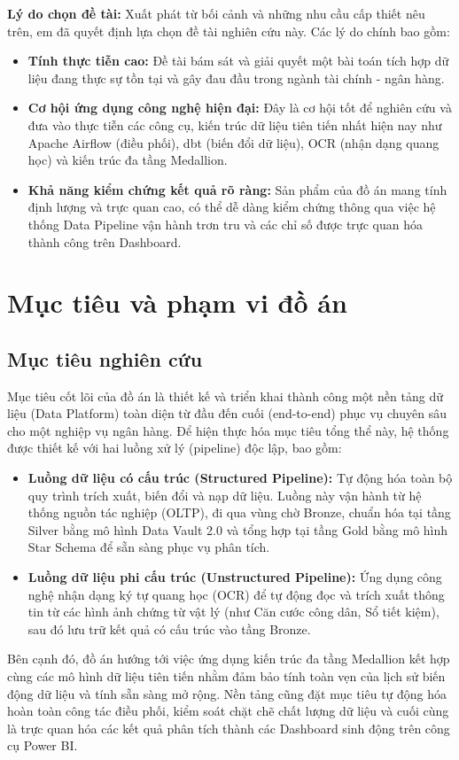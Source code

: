 \textbf{Lý do chọn đề tài:} 
Xuất phát từ bối cảnh và những nhu cầu cấp thiết nêu trên, em đã quyết định lựa chọn đề tài nghiên cứu này. Các lý do chính bao gồm:
\begin{itemize}
    \item \textbf{Tính thực tiễn cao:} Đề tài bám sát và giải quyết một bài toán tích hợp dữ liệu đang thực sự tồn tại và gây đau đầu trong ngành tài chính - ngân hàng.
    \item \textbf{Cơ hội ứng dụng công nghệ hiện đại:} Đây là cơ hội tốt để nghiên cứu và đưa vào thực tiễn các công cụ, kiến trúc dữ liệu tiên tiến nhất hiện nay như Apache Airflow (điều phối), dbt (biến đổi dữ liệu), OCR (nhận dạng quang học) và kiến trúc đa tầng Medallion.
    \item \textbf{Khả năng kiểm chứng kết quả rõ ràng:} Sản phẩm của đồ án mang tính định lượng và trực quan cao, có thể dễ dàng kiểm chứng thông qua việc hệ thống Data Pipeline vận hành trơn tru và các chỉ số được trực quan hóa thành công trên Dashboard.
\end{itemize}

\section{Mục tiêu và phạm vi đồ án}

\subsection{Mục tiêu nghiên cứu}
Mục tiêu cốt lõi của đồ án là thiết kế và triển khai thành công một nền tảng dữ liệu (Data Platform) toàn diện từ đầu đến cuối (end-to-end) phục vụ chuyên sâu cho một nghiệp vụ ngân hàng. Để hiện thực hóa mục tiêu tổng thể này, hệ thống được thiết kế với hai luồng xử lý (pipeline) độc lập, bao gồm:
\begin{itemize}
    \item \textbf{Luồng dữ liệu có cấu trúc (Structured Pipeline):} Tự động hóa toàn bộ quy trình trích xuất, biến đổi và nạp dữ liệu. Luồng này vận hành từ hệ thống nguồn tác nghiệp (OLTP), đi qua vùng chờ Bronze, chuẩn hóa tại tầng Silver bằng mô hình Data Vault 2.0 và tổng hợp tại tầng Gold bằng mô hình Star Schema để sẵn sàng phục vụ phân tích.
    \item \textbf{Luồng dữ liệu phi cấu trúc (Unstructured Pipeline):} Ứng dụng công nghệ nhận dạng ký tự quang học (OCR) để tự động đọc và trích xuất thông tin từ các hình ảnh chứng từ vật lý (như Căn cước công dân, Sổ tiết kiệm), sau đó lưu trữ kết quả có cấu trúc vào tầng Bronze.
\end{itemize}
Bên cạnh đó, đồ án hướng tới việc ứng dụng kiến trúc đa tầng Medallion kết hợp cùng các mô hình dữ liệu tiên tiến nhằm đảm bảo tính toàn vẹn của lịch sử biến động dữ liệu và tính sẵn sàng mở rộng. Nền tảng cũng đặt mục tiêu tự động hóa hoàn toàn công tác điều phối, kiểm soát chặt chẽ chất lượng dữ liệu và cuối cùng là trực quan hóa các kết quả phân tích thành các Dashboard sinh động trên công cụ Power BI.

